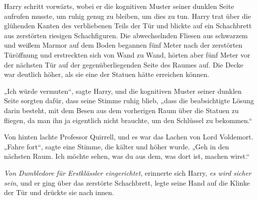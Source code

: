 Harry schritt vorwärts, wobei er die kognitiven Muster seiner dunklen Seite aufrufen musste, um ruhig genug zu bleiben, um dies zu tun. Harry trat über die glühenden Kanten des verbliebenen Teils der Tür und blickte auf ein Schachbrett aus zerstörten riesigen Schachfiguren. Die abwechselnden Fliesen aus schwarzem und weißem Marmor auf dem Boden begannen fünf Meter nach der zerstörten Türöffnung und erstreckten sich von Wand zu Wand, hörten aber fünf Meter vor der nächsten Tür auf der gegenüberliegenden Seite des Raumes auf. Die Decke war deutlich höher, als sie eine der Statuen hätte erreichen können.

„Ich würde vermuten“, sagte Harry, und die kognitiven Muster seiner dunklen Seite sorgten dafür, dass seine Stimme ruhig blieb, „dass die beabsichtigte Lösung darin besteht, mit dem Besen aus dem vorherigen Raum über die Statuen zu fliegen, da man ihn ja eigentlich nicht brauchte, um den Schlüssel zu bekommen.“

Von hinten lachte Professor Quirrell, und es war das Lachen von Lord Voldemort.
„Fahre fort“, sagte eine Stimme, die kälter und höher wurde.
„Geh in den nächsten Raum. Ich möchte sehen, was du aus dem, was dort ist, machen wirst.“

\emph{Von Dumbledore für Erstklässler eingerichtet}, erinnerte sich Harry, \emph{es \emph{wird} sicher sein}, und er ging über das zerstörte Schachbrett, legte seine Hand auf die Klinke der Tür und drückte sie nach innen.


